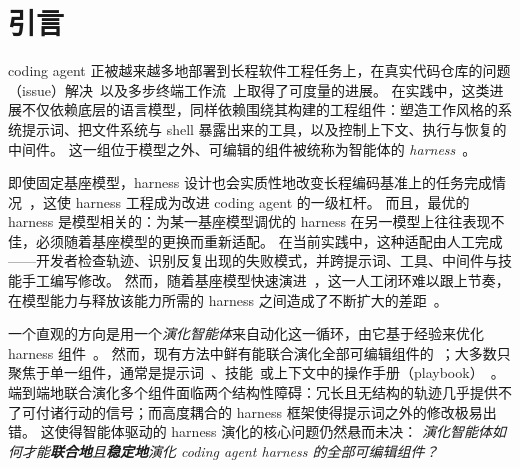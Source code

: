 \section{引言}
\label{sec:introduction}


coding agent 正被越来越多地部署到长程软件工程任务上，在真实代码仓库的问题（issue）解决~\citep{jimenezSWEbenchCanLanguage2023,yangSWEbenchMultimodalAI2024,dengSWEBenchProCan2025}以及多步终端工作流~\citep{merrillTerminalBenchBenchmarkingAgents2026a}上取得了可度量的进展。
在实践中，这类进展不仅依赖底层的语言模型，同样依赖围绕其构建的工程组件：塑造工作风格的系统提示词、把文件系统与 shell 暴露出来的工具，以及控制上下文、执行与恢复的中间件。
这一组位于模型之外、可编辑的组件被统称为智能体的 \emph{harness}~\citep{rajasekaranHarnessDesignLongrunning2026,lopopoloHarnessEngineeringLeveraging2026,wangOpenHandsOpenPlatform2025,yangSWEagentAgentComputerInterfaces2024,steinbergerOpenClawPersonalAI2026,HermesAgentAgent}。


即使固定基座模型，harness 设计也会实质性地改变长程编码基准上的任务完成情况~\citep{trivedyImprovingDeepAgents2026,wangOpenHandsOpenPlatform2025}，这使 harness 工程成为改进 coding agent 的一级杠杆。
而且，最优的 harness 是模型相关的：为某一基座模型调优的 harness 在另一模型上往往表现不佳，必须随着基座模型的更换而重新适配。
在当前实践中，这种适配由人工完成——开发者检查轨迹、识别反复出现的失败模式，并跨提示词、工具、中间件与技能手工编写修改。
然而，随着基座模型快速演进~\citep{xiaomimimoteamMiMoV25Pro2026,teamQwen36PlusRealWorld2026,yangQwen3TechnicalReport2025a,DeepSeek_V4pdfDeepseekaiDeepSeekV4Pro2026,kimiteamKimiK26Tech2026,teamKimiK25Visual2026}，这一人工闭环难以跟上节奏，在模型能力与释放该能力所需的 harness 之间造成了不断扩大的差距~\citep{steinbergerOpenClawPersonalAI2026}。


一个直观的方向是用一个\textit{演化智能体}来自动化这一循环，由它基于经验来优化 harness 组件~\citep{agrawalGEPAReflectivePrompt2025a,zhangAgenticContextEngineering2025a,caiTrainingFreeGroupRelative2025}。
然而，现有方法中鲜有能联合演化全部可编辑组件的~\citep{leeMetaHarnessEndtoEndOptimization2026}；大多数只聚焦于单一组件，通常是提示词~\citep{shinnReflexionLanguageAgents2023c,zhaoExpeLLLMAgents2024,madaanSelfRefineIterativeRefinement2023c}、技能~\citep{maSkillClawLetSkills2026b,xiaSkillRLEvolvingAgents2026c}或上下文中的操作手册（playbook）~\citep{zhangAgenticContextEngineering2025a}。
端到端地联合演化多个组件面临两个结构性障碍：冗长且无结构的轨迹几乎提供不了可付诸行动的信号；而高度耦合的 harness 框架使得提示词之外的修改极易出错。
这使得智能体驱动的 harness 演化的核心问题仍然悬而未决：
\textit{演化智能体如何才能\textbf{联合地}且\textbf{稳定地}演化 coding agent harness 的全部可编辑组件？}

